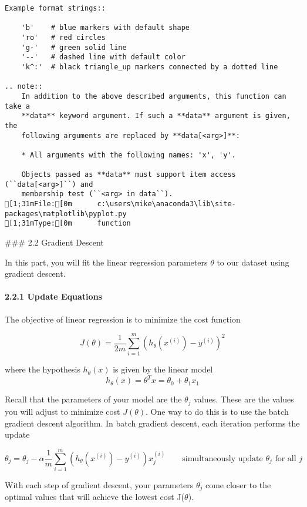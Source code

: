 \documentclass[11pt]{article}
\begin{document}
\begin{verbatim}
Example format strings::

    'b'    # blue markers with default shape
    'ro'   # red circles
    'g-'   # green solid line
    '--'   # dashed line with default color
    'k^:'  # black triangle_up markers connected by a dotted line

.. note::
    In addition to the above described arguments, this function can take a
    **data** keyword argument. If such a **data** argument is given, the
    following arguments are replaced by **data[<arg>]**:

    * All arguments with the following names: 'x', 'y'.

    Objects passed as **data** must support item access (``data[<arg>]``) and
    membership test (``<arg> in data``).
[1;31mFile:[0m      c:\users\mike\anaconda3\lib\site-packages\matplotlib\pyplot.py
[1;31mType:[0m      function

    \end{verbatim}

    
     \#\#\# 2.2 Gradient Descent

In this part, you will fit the linear regression parameters \(\theta\)
to our dataset using gradient descent.

\paragraph{2.2.1 Update Equations}\label{update-equations}

The objective of linear regression is to minimize the cost function

\[ J(\theta) = \frac{1}{2m} \sum_{i=1}^m \left( h_{\theta}(x^{(i)}) - y^{(i)}\right)^2\]

where the hypothesis \(h_\theta(x)\) is given by the linear model
\[ h_\theta(x) = \theta^Tx = \theta_0 + \theta_1 x_1\]

Recall that the parameters of your model are the \(\theta_j\) values.
These are the values you will adjust to minimize cost \(J(\theta)\). One
way to do this is to use the batch gradient descent algorithm. In batch
gradient descent, each iteration performs the update

\[ \theta_j = \theta_j - \alpha \frac{1}{m} \sum_{i=1}^m \left( h_\theta(x^{(i)}) - y^{(i)}\right)x_j^{(i)} \qquad \text{simultaneously update } \theta_j \text{ for all } j\]

With each step of gradient descent, your parameters \(\theta_j\) come
closer to the optimal values that will achieve the lowest cost
J(\(\theta\)).
\end{document}
